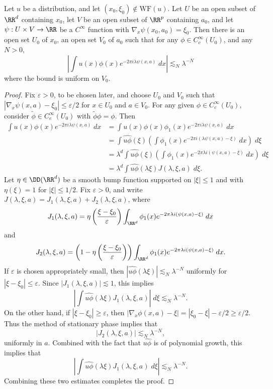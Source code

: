 \begin{theorem}
    Let $u$ be a distribution, and let $(x_0,\xi_0) \not \in \text{WF}(u)$. Let $U$ be an open subset of $\RR^d$ containing $x_0$, let $V$ be an open subset of $\RR^p$ containing $a_0$, and let $\psi: U \times V \to \RR$ be a $C^\infty$ function with $\nabla_x \psi(x_0,a_0) = \xi_0$. Then there is an open set $U_0$ of $x_0$, an open set $V_0$ of $a_0$ such that for any $\phi \in C_c^\infty(U_0)$, and any $N > 0$,
    \[ \left| \int u(x) \phi(x) e^{-2 \pi i \lambda \psi(x,a)}\; dx \right| \lesssim_N \lambda^{-N} \]
    where the bound is uniform on $V_0$.
\end{theorem}
\begin{proof}
    Fix $\varepsilon > 0$, to be chosen later, and choose $U_0$ and $V_0$ such that $|\nabla_x \psi(x,a) - \xi_0| \leq \varepsilon/2$ for $x \in U_0$ and $a \in V_0$. For any given $\phi \in C_c^\infty(U_0)$, consider $\tilde{\phi} \in C_c^\infty(U_0)$ with $\tilde{\phi} \phi = \phi$. Then
    \begin{align*}
        \int u(x) \phi(x) e^{-2 \pi i \lambda \psi(x,a)}\; dx &= \int u(x) \phi(x) \phi_1(x) e^{-2 \pi i \lambda \psi(x,a)}\; dx\\
        &= \int \widehat{u \phi}(\xi) \left( \int \phi_1(x) e^{-2 \pi i (\lambda \psi(x,a) - \xi)}\; dx \right)\; d\xi\\
        &= \lambda^d \int \widehat{u \phi}(\xi) \left( \int \phi_1(x) e^{-2 \pi \lambda i(\psi(x,a) - \xi)}\; dx \right)\; d\xi\\
        &= \lambda^d \int \widehat{u \phi}(\lambda \xi) J(\lambda,\xi,a)\; d\xi.
    \end{align*}
    Let $\eta \in \DD(\RR^d)$ be a smooth bump function supported on $|\xi| \leq 1$ and with $\eta(\xi) = 1$ for $|\xi| \leq 1/2$. Fix $\varepsilon > 0$, and write $J(\lambda,\xi,a) = J_1(\lambda,\xi,a) + J_2(\lambda,\xi,a)$, where
    \[ J_1(\lambda,\xi,a) = \eta \left( \frac{\xi - \xi_0}{\varepsilon} \right) \int_{\RR^d} \phi_1(x) e^{-2 \pi \lambda i(\psi(x,a) - \xi)}\; dx \]
    and
    \[ J_2(\lambda,\xi,a) = \left(1 - \eta \left( \frac{\xi - \xi_0}{\varepsilon} \right) \right) \int_{\RR^d} \phi_1(x) e^{-2 \pi \lambda i (\psi(x,a) - \xi)}\; dx. \]
    If $\varepsilon$ is chosen appropriately small, then $|\widehat{u \phi}(\lambda \xi)| \lesssim_N \lambda^{-N}$ uniformly for $|\xi - \xi_0| \leq \varepsilon$. Since $|J_1(\lambda,\xi,a)| \lesssim 1$, this implies
    \[ \left| \int \widehat{u \phi}(\lambda \xi) J_1(\lambda,\xi,a) \right|\; d\xi \lesssim_N \lambda^{-N}. \]
    On the other hand, if $|\xi - \xi_0| \geq \varepsilon$, then $|\nabla_x \phi(x,a) - \xi| = |\xi_0 - \xi| - \varepsilon/2 \geq \varepsilon/2$. Thus the method of stationary phase implies that
    \[ |J_2(\lambda,\xi,a)| \lesssim_N \lambda^{-N}, \]
    uniformly in $a$. Combined with the fact that $\widehat{u \phi}$ is of polynomial growth, this implies that
    \[ \left| \int \widehat{u \phi}(\lambda \xi) J_1(\lambda,\xi,a)\; d\xi \right| \lesssim_N \lambda^{-N}. \]
    Combining these two estimates completes the proof.
\end{proof}

